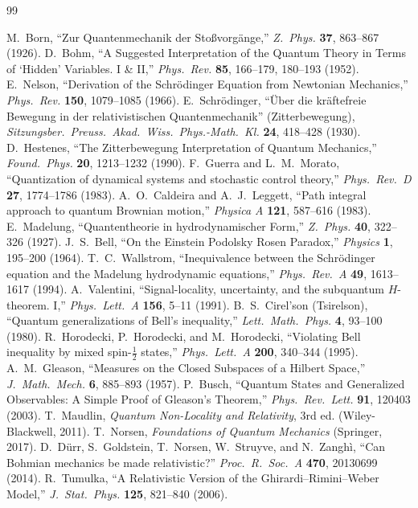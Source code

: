 \documentclass[11pt]{article}
\begin{document}
\begingroup\small
\begin{thebibliography}{99}
 M.~Born, ``Zur Quantenmechanik der Sto\ss vorg\"ange,''
  \emph{Z.\ Phys.} \textbf{37}, 863--867 (1926).
 D.~Bohm, ``A Suggested Interpretation of the Quantum Theory in Terms of `Hidden'
  Variables. I \& II,'' \emph{Phys.\ Rev.} \textbf{85}, 166--179, 180--193 (1952).
 E.~Nelson, ``Derivation of the Schr\"odinger Equation from Newtonian Mechanics,''
  \emph{Phys.\ Rev.} \textbf{150}, 1079--1085 (1966).
 E.~Schr\"odinger, ``\"Uber die kr\"aftefreie Bewegung in der relativistischen
  Quantenmechanik'' (Zitterbewegung), \emph{Sitzungsber.\ Preuss.\ Akad.\ Wiss.\ Phys.-Math.\ Kl.}
  \textbf{24}, 418--428 (1930).
 D.~Hestenes, ``The Zitterbewegung Interpretation of Quantum Mechanics,''
  \emph{Found.\ Phys.} \textbf{20}, 1213--1232 (1990).
 F.~Guerra and L.~M.~Morato, ``Quantization of dynamical systems and stochastic
  control theory,'' \emph{Phys.\ Rev.\ D} \textbf{27}, 1774--1786 (1983).
 A.~O.~Caldeira and A.~J.~Leggett, ``Path integral approach to quantum
  Brownian motion,'' \emph{Physica A} \textbf{121}, 587--616 (1983).
 E.~Madelung, ``Quantentheorie in hydrodynamischer Form,''
  \emph{Z.\ Phys.} \textbf{40}, 322--326 (1927).
 J.~S.~Bell, ``On the Einstein Podolsky Rosen Paradox,''
  \emph{Physics} \textbf{1}, 195--200 (1964).
 T.~C.~Wallstrom, ``Inequivalence between the Schr\"odinger equation and the
  Madelung hydrodynamic equations,'' \emph{Phys.\ Rev.\ A} \textbf{49}, 1613--1617 (1994).
 A.~Valentini, ``Signal-locality, uncertainty, and the subquantum
  $H$-theorem. I,'' \emph{Phys.\ Lett.\ A} \textbf{156}, 5--11 (1991).
 B.~S.~Cirel'son (Tsirelson), ``Quantum generalizations of Bell's inequality,''
  \emph{Lett.\ Math.\ Phys.} \textbf{4}, 93--100 (1980).
 R.~Horodecki, P.~Horodecki, and M.~Horodecki, ``Violating Bell inequality by
  mixed spin-$\tfrac12$ states,'' \emph{Phys.\ Lett.\ A} \textbf{200}, 340--344 (1995).
 A.~M.~Gleason, ``Measures on the Closed Subspaces of a Hilbert Space,''
  \emph{J.\ Math.\ Mech.} \textbf{6}, 885--893 (1957).
 P.~Busch, ``Quantum States and Generalized Observables: A Simple Proof of Gleason's
  Theorem,'' \emph{Phys.\ Rev.\ Lett.} \textbf{91}, 120403 (2003).
 T.~Maudlin, \emph{Quantum Non-Locality and Relativity}, 3rd ed.
  (Wiley-Blackwell, 2011).
 T.~Norsen, \emph{Foundations of Quantum Mechanics} (Springer, 2017).
 D.~D\"urr, S.~Goldstein, T.~Norsen, W.~Struyve, and N.~Zangh\`i, ``Can Bohmian
  mechanics be made relativistic?'' \emph{Proc.\ R.\ Soc.\ A} \textbf{470}, 20130699 (2014).
 R.~Tumulka, ``A Relativistic Version of the Ghirardi--Rimini--Weber Model,''
  \emph{J.\ Stat.\ Phys.} \textbf{125}, 821--840 (2006).
\end{thebibliography}
\endgroup
\end{document}

